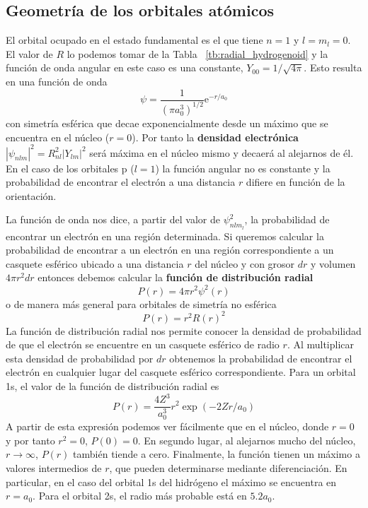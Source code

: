 \documentclass{tufte-handout}
\begin{document}
\subsection{Geometría de los orbitales atómicos}
El orbital ocupado en el estado fundamental es el que tiene $n=1$
y $l=m_l=0$. El valor de $R$ lo podemos tomar de la Tabla~
\ref{tb:radial_hydrogenoid} y la función de onda angular en 
este caso es una constante, $Y_{00}=1/\sqrt{4\pi}$.
Esto resulta en una función de onda 
\begin{equation}
    \psi=\frac{1}{(\pi a_0^3)^{1/2}}\mathrm{e}^{-r/a_0}
\end{equation}
con simetría esférica que decae exponencialmente desde un máximo
que se encuentra en el núcleo ($r=0$). Por tanto la \textbf{densidad 
electrónica} $|\psi_{nlm}|^2=R^2_{nl}|Y_{lm}|^2$ 
será máxima en el núcleo mismo y decaerá al alejarnos de él. 
En el caso de los orbitales p ($l=1$) la función angular no 
es constante y la probabilidad de encontrar el electrón a 
una distancia $r$ difiere en función de la orientación.

La función de onda nos dice, a partir del valor de $\psi_{nlm_l}^2$,
la probabilidad de encontrar un electrón en una región determinada.
Si queremos calcular la probabilidad de encontrar a un electrón
en una región correspondiente a un casquete esférico ubicado 
a una distancia $r$ del núcleo y con grosor $dr$ y volumen 
$4\pi r^2dr$ entonces debemos calcular la \textbf{función de distribución 
radial}
\begin{equation}
    P(r)=4\pi r^2\psi^2(r)
\end{equation}
o de manera más general para orbitales de simetría no esférica
\begin{equation}
    P(r)=r^2R(r)^2
\end{equation}
La función de distribución radial  nos permite conocer la densidad de
probabilidad de que el electrón
se encuentre en un casquete esférico de radio $r$. Al multiplicar
esta densidad de probabilidad por $dr$ obtenemos la probabilidad de
encontrar el electrón en cualquier lugar del casquete esférico 
correspondiente. Para un orbital 1s, el valor de la función de
distribución radial es 
\begin{equation}
    P(r)=\frac{4Z^3}{a_0^3}r^2\exp(-2Zr/a_0)
\end{equation}
A partir de esta expresión podemos ver fácilmente que en el núcleo, donde
$r=0$ y por tanto $r^2=0$, $P(0)=0$. En segundo lugar, al alejarnos mucho
del núcleo, $r\xrightarrow{}\infty$, $P(r)$ también tiende a cero. Finalmente,
la función tienen un máximo a valores intermedios de $r$, que pueden determinarse
mediante diferenciación. En particular, en el caso del orbital 1s del
hidrógeno el máximo se encuentra en $r=a_0$. Para el orbital 2s, el radio
más probable está en $5.2a_0$. 
\end{document}

